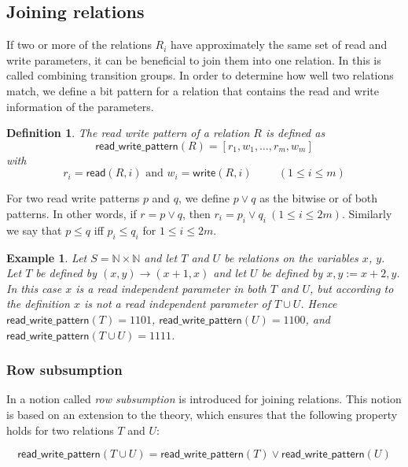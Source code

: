 \documentclass{article}
\newtheorem{definition}[theorem]{Definition}
\newtheorem{example}[theorem]{Example}
\begin{document}
\subsection{Joining relations}
If two or more of the relations $R_i$ have approximately the same set of read and write parameters, it can be beneficial to join them into one relation. In \cite{Meijer2019} this is called combining transition groups. 
In order to
determine how well two relations match, we define a bit pattern for a relation that contains the read and write information of the parameters.

\begin{definition}
The read write pattern of a relation $R$ is defined as
\[
\textsf{read\_write\_pattern}(R) = [r_1, w_1, \ldots, r_m, w_m]
\]
with
\[
  r_i = \textsf{read}(R, i) \text{ and } w_i = \textsf{write}(R, i) \hspace{1cm} (1 \leq i \leq m)
\]
\end{definition}
For two read write patterns $p$ and $q$, we define $p \lor q$ as the bitwise or of both patterns. In other words, if $r = p \lor q$, then $r_i = p_i \lor q_i ~ (1 \leq i \leq 2m)$. Similarly we say that $p \leq q$ iff $p_i \leq q_i$ for $1 \leq i \leq 2m$.

\begin{example}
Let $S = \mathbb{N} \times \mathbb{N}$ and let $T$ and $U$ be relations on the variables $x$, $y$. Let $T$ be defined by 
$(x,y) \rightarrow (x + 1, x)$
and let $U$ be defined by
$x, y := x + 2, y$.
In this case $x$ is a read independent parameter in both $T$ and $U$, but according to the definition $x$ is not a read independent parameter of 
$T \cup U$.
Hence $\textsf{read\_write\_pattern}(T) = 1101$,
$\textsf{read\_write\_pattern}(U) = 1100$, and
$\textsf{read\_write\_pattern}(T \cup U) = 1111$. 
\end{example}

\subsubsection{Row subsumption}
In \cite{Meijer2019} a notion called \emph{row subsumption} is
introduced for joining relations. This notion is based on an extension to the theory, which ensures that the following property holds for two relations $T$ and $U$:

\begin{equation} \label{bitwise_or}
\textsf{read\_write\_pattern}(T \cup U) = \textsf{read\_write\_pattern}(T) \lor \textsf{read\_write\_pattern}(U)
\end{equation}
\end{document}
